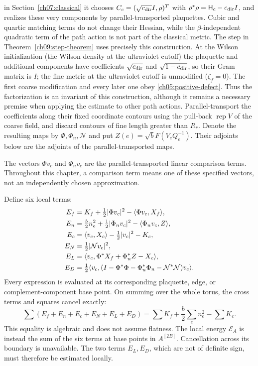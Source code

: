 in Section~\ref{ch07:classical} it chooses
$C_c=(\sqrt{c_{\rm dir}}I,\rho)^T$ with
$\rho^*\rho=\mathsf H_c-c_{\rm dir}I$, and realizes these very components
by parallel-transported plaquettes. Cubic and quartic matching terms do not
change their Hessian, while the $\beta$-independent quadratic term of the path action is not part
of the classical metric. The step in Theorem~\ref{ch09:step-theorem}
uses precisely this construction. At the Wilson initialization (the Wilson density at the ultraviolet cutoff) the plaquette
and additional components have coefficients $\sqrt{c_{\rm dir}}$ and
$\sqrt{1-c_{\rm dir}}$, so their Gram matrix is $I$; the
fine metric at the ultraviolet cutoff is unmodified ($\zeta_f=0$). The first coarse modification
and every later one obey \eqref{ch05:positive-defect}. Thus the factorization
is an invariant of this construction, although it remains a
necessary premise when applying the estimate to other path actions.
Parallel-transport the coefficients
along their fixed coordinate contours using the pull-back $\operatorname{rep}V$ of the coarse field,
and discard contours of fine length greater than $R_*$. Denote the resulting
maps by $\Phi,\Phi_n,\mathcal N$ and put
$Z(e)=\sqrt b F(V_eQ_e^{-1})$. Their adjoints below are the adjoints of the
parallel-transported maps.

The vectors $\Phi v_c$ and $\Phi_n v_c$ are the parallel-transported linear
comparison terms. Throughout this chapter, a comparison term means one
of these specified vectors, not an independently chosen approximation.

Define six local terms:
\begin{align}
 E_f&=K_f+\tfrac12|\Phi v_c|^2-\langle\Phi v_c,X_f\rangle,\notag\\
 E_n&=\tfrac b2 n_e^2+\tfrac12|\Phi_n v_c|^2
                                      -\langle\Phi_n v_c,Z\rangle,\notag\\
 E_c&=\langle v_c,X_c\rangle-\tfrac12|v_c|^2-K_c,\notag\\
 E_N&=\tfrac12|\mathcal N v_c|^2,\notag\\
 E_L&=\langle v_c,\Phi^*X_f+\Phi_n^*Z-X_c\rangle,\notag\\
 E_D&=\tfrac12\langle v_c,
       (I-\Phi^*\Phi-\Phi_n^*\Phi_n-\mathcal N^*\mathcal N)v_c\rangle.
 \label{ch06:six-terms}
\end{align}
Every expression is evaluated at its corresponding plaquette, edge, or
complement-component base point. On summing over the whole torus, the cross terms
and squares cancel exactly:
\begin{equation}
 \sum(E_f+E_n+E_c+E_N+E_L+E_D)
       =\sum K_f+\frac b2\sum_e n_e^2-\sum K_c.
 \label{ch06:global-energy}
\end{equation}
This equality is algebraic and does not assume flatness. The local energy
$\mathcal E_A$ is instead the sum of the six terms at base points in
$A^{[2B]}$. Cancellation across its boundary is unavailable. The two terms $E_L,E_D$, which are not of definite sign,
must therefore be estimated locally.


